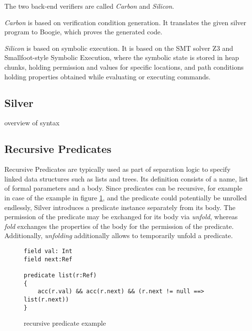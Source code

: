 \documentclass[12pt]{article}
\begin{document}
The two back-end verifiers are called \textit{Carbon} and \textit{Silicon}. 

\textit{Carbon}  is based on verification condition generation. It translates the given silver program to Boogie\cite{leino2008boogie}, which proves the generated code.%

\textit{Silicon} is based on symbolic execution. It is based on the SMT solver Z3\cite{de2008z3} and Smallfoot-style Symbolic Execution\cite{berdine2005smallfoot}, where the symbolic state is stored in heap chunks, holding permission and values for specific locations, and path conditions holding properties obtained while evaluating or executing commands.

\subsection{Silver}
overview of syntax

\subsection{Recursive Predicates}

Recursive Predicates\cite{parkinson2005separation} are typically used as part of separation logic to specify linked data structures such as lists and trees. Its definition consists of a name,  list of formal parameters and a body. 
Since predicates can be recursive, for example in case of the example in figure \ref{rec}, and the predicate could potentially be unrolled endlessly, Silver introduces a predicate instance separately from its body.
The permission of the predicate may be exchanged for its body via \textit{unfold}, whereas \textit{fold} exchanges the properties of the body for the permission of the predicate. Additionally, \textit{unfolding} additionally allows to temporarily unfold a predicate.

\begin{figure}[h]
  \centering
\begin{lstlisting}
field val: Int
field next:Ref

predicate list(r:Ref)
{
    acc(r.val) && acc(r.next) && (r.next != null ==> list(r.next))
}
\end{lstlisting}
\caption[recursive predicate]
   {recursive predicate example}
\label{rec}
\end{figure}
\end{document}
